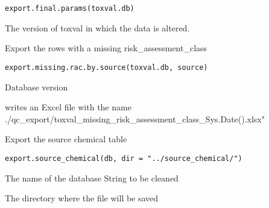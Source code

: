 \documentclass[letterpaper]{book}
\begin{document}
%
\begin{Usage}
\begin{verbatim}
export.final.params(toxval.db)
\end{verbatim}
\end{Usage}
%
\begin{Arguments}
\begin{ldescription}
\item[\code{toxval.db}] The version of toxval in which the data is altered.
\end{ldescription}
\end{Arguments}
%
\begin{Description}\relax
Export the rows with a missing risk\_assessment\_class
\end{Description}
%
\begin{Usage}
\begin{verbatim}
export.missing.rac.by.source(toxval.db, source)
\end{verbatim}
\end{Usage}
%
\begin{Arguments}
\begin{ldescription}
\item[\code{toxval.db}] Database version
\end{ldescription}
\end{Arguments}
%
\begin{Value}
writes an Excel file with the name
./qc\_export/toxval\_missing\_risk\_assessment\_class\_Sys.Date().xlsx"
\end{Value}
%
\begin{Description}\relax
Export the source chemical table
\end{Description}
%
\begin{Usage}
\begin{verbatim}
export.source_chemical(db, dir = "../source_chemical/")
\end{verbatim}
\end{Usage}
%
\begin{Arguments}
\begin{ldescription}
\item[\code{db}] The name of the database String to be cleaned

\item[\code{dir}] The directory where the file will be saved
\end{ldescription}
\end{Arguments}
\end{document}
